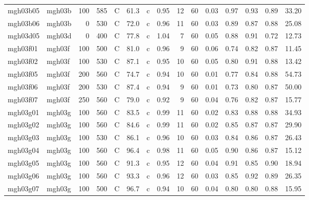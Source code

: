 \documentclass{article}
\begin{document}
\begin{landscape}
\begin{longtable}{llrrlrlrrrrrrrr}
    mgh03b05 &     mgh03b &  100 &  585 &     C &    61.3 &   c &  0.95 &  12 &         60 &  0.03 &  0.97 &  0.93 &  0.89 &   33.20 \\
    mgh03b06 &     mgh03b &    0 &  530 &     C &    72.0 &   c &  0.96 &  11 &         60 &  0.03 &  0.89 &  0.87 &  0.88 &   25.08 \\
    mgh03d05 &     mgh03d &    0 &  400 &     C &    77.8 &   c &  1.04 &   7 &         60 &  0.05 &  0.88 &  0.91 &  0.72 &   12.73 \\
    mgh03f01 &     mgh03f &  100 &  500 &     C &    81.0 &   c &  0.96 &   9 &         60 &  0.06 &  0.74 &  0.82 &  0.87 &   11.45 \\
    mgh03f02 &     mgh03f &  100 &  530 &     C &    87.1 &   c &  0.95 &  10 &         60 &  0.05 &  0.80 &  0.91 &  0.88 &   13.42 \\
    mgh03f05 &     mgh03f &  200 &  560 &     C &    74.7 &   c &  0.94 &  10 &         60 &  0.01 &  0.77 &  0.84 &  0.88 &   54.73 \\
    mgh03f06 &     mgh03f &  200 &  530 &     C &    87.4 &   c &  0.94 &   9 &         60 &  0.01 &  0.73 &  0.80 &  0.87 &   50.00 \\
    mgh03f07 &     mgh03f &  250 &  560 &     C &    79.0 &   c &  0.92 &   9 &         60 &  0.04 &  0.76 &  0.82 &  0.87 &   15.77 \\
    mgh03g01 &     mgh03g &  100 &  560 &     C &    83.5 &   c &  0.99 &  11 &         60 &  0.02 &  0.83 &  0.88 &  0.88 &   34.93 \\
    mgh03g02 &     mgh03g &  100 &  560 &     C &    84.6 &   c &  0.99 &  11 &         60 &  0.02 &  0.85 &  0.87 &  0.87 &   29.90 \\
    mgh03g03 &     mgh03g &  100 &  530 &     C &    86.1 &   c &  0.96 &  10 &         60 &  0.03 &  0.84 &  0.86 &  0.87 &   26.43 \\
    mgh03g04 &     mgh03g &  100 &  560 &     C &    96.4 &   c &  0.98 &  11 &         60 &  0.05 &  0.90 &  0.86 &  0.87 &   15.12 \\
    mgh03g05 &     mgh03g &  100 &  560 &     C &    91.3 &   c &  0.95 &  12 &         60 &  0.04 &  0.91 &  0.85 &  0.90 &   18.94 \\
    mgh03g06 &     mgh03g &  100 &  560 &     C &    93.3 &   c &  0.96 &  12 &         60 &  0.03 &  0.85 &  0.92 &  0.89 &   26.35 \\
    mgh03g07 &     mgh03g &  100 &  500 &     C &    96.7 &   c &  0.94 &  10 &         60 &  0.04 &  0.80 &  0.80 &  0.88 &   15.95 \\

\end{longtable}
\end{landscape}
\end{document}
